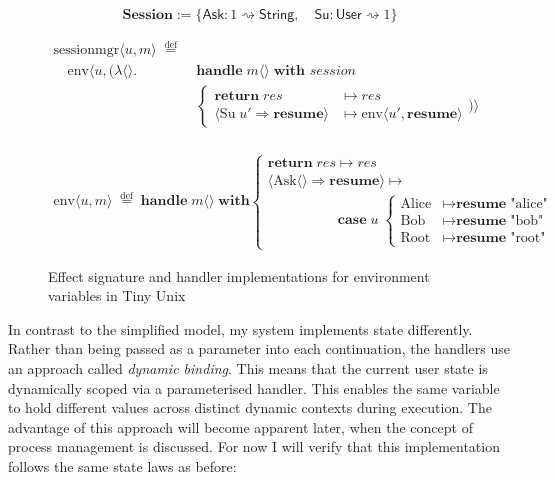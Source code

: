 \documentclass[logo,bsc,singlespacing,parskip]{infthesis}
\begin{document}
\begin{figure}[H]
\centering
\[
\mathsf{\textbf{Session}} := \{ \mathsf{Ask} : 1 \rightsquigarrow \mathsf{String}, \quad \mathsf{Su} : \mathsf{User} \rightsquigarrow 1 \}
\]

\vspace{-1em}

\begin{align*}
\text{sessionmgr} \langle u, m \rangle \;\overset{\mathrm{def}}{=}\;& \\
\quad \text{env} \langle u, (\lambda \langle \rangle.\; &\textbf{handle}\; m \langle \rangle\; \textbf{with } session \\
&\left\{
\begin{array}{ll}
  \textbf{return}\; res & \mapsto res \\
  \langle \text{Su}\; u' \Rightarrow \textbf{resume} \rangle & \mapsto \text{env} \langle u', \textbf{resume} \rangle
\end{array}
\right.
) \rangle
\end{align*}

\vspace{-1em}
 
\[
\begin{array}{l}
\\
\text{env} \langle \mathit{u}, m \rangle \;\overset{\mathrm{def}}{=} \;
\textbf{handle}\; m \langle \rangle\; \textbf{with} \left\{
\begin{array}{ll}
\textbf{return}\; res  \mapsto res \\
\langle \text{Ask} \langle \rangle \Rightarrow \textbf{resume} \rangle  \mapsto \\
\quad\quad\quad\quad\quad\textbf{case}\; \mathit{u}\; \left\{
\begin{array}{ll}
\text{Alice} & \mapsto \textbf{resume}\; \text{"alice"} \\
\text{Bob} & \mapsto \textbf{resume}\; \text{"bob"} \\
\text{Root} & \mapsto \textbf{resume}\; \text{"root"}
\end{array}
\right.
\end{array}
\right.
\end{array}
\]

\caption{Effect signature and handler implementations for environment variables in Tiny Unix}
\label{fig:env-state-handler}
\end{figure}

In contrast to the simplified model, my system implements state differently. Rather than being passed as a parameter into each continuation, the handlers use an approach called \textit{dynamic binding}. This means that the current user state is dynamically scoped via a parameterised handler. This enables the same variable to hold different values across distinct dynamic contexts during execution. The advantage of this approach will become apparent later, when the concept of process management is discussed. For now I will verify that this implementation follows the same state laws as before:
\end{document}
